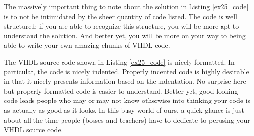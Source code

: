 \begin{my_list}
\item The massively important thing to note about the solution in Listing \ref{ex25_code} is to not be intimidated by the sheer quantity of code listed. The code is well structured; if you are able to recognize this structure, you will be more apt to understand the solution. And better yet, you will be more on your way to being able to write your own amazing chunks of VHDL code. 

\item The VHDL source code shown in Listing \ref{ex25_code} is nicely formatted. In particular, the code is nicely indented. Properly indented code is highly desirable in that it nicely presents information based on the indentation. No surprise here but properly formatted code is easier to understand. Better yet, good looking code leads people who may or may not know otherwise into thinking your code is as actually as good as it looks. In this busy world of ours, a quick glance is just about all the time people (bosses and teachers) have to dedicate to perusing your VHDL source code.
\end{my_list}

